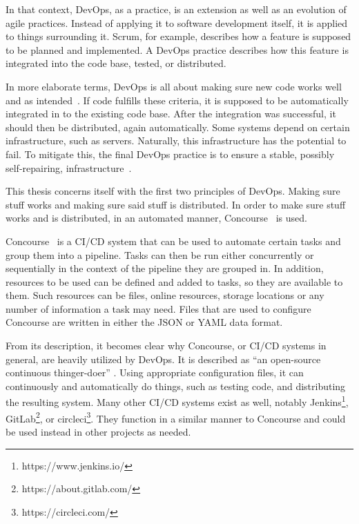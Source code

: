 In that context, DevOps, as a practice, is an extension as well as an evolution of agile practices.
Instead of applying it to software development itself, it is applied to things surrounding it.
Scrum, for example, describes how a feature is supposed to be planned and implemented.
A DevOps practice describes how this feature is integrated into the code base, tested, or distributed.

In more elaborate terms, DevOps is all about making sure new code works well and as intended~\cite{the-software-architext-and-devops}.
If code fulfills these criteria, it is supposed to be automatically integrated in to the existing code base.
After the integration was successful, it should then be distributed, again automatically.
Some systems depend on certain infrastructure, such as servers.
Naturally, this infrastructure has the potential to fail.
To mitigate this, the final DevOps practice is to ensure a stable, possibly self-repairing, infrastructure~\cite{container-and-microservice-driven-design-for-cloud-infrastructure-devops}.

This thesis concerns itself with the first two principles of DevOps.
Making sure stuff works and making sure said stuff is distributed.
In order to make sure stuff works and is distributed, in an automated manner, Concourse~\cite{concourse} is used.

Concourse~\cite{concourse} is a CI/CD system that can be used to automate certain tasks and group them into a pipeline.
Tasks can then be run either concurrently or sequentially in the context of the pipeline they are grouped in.
In addition, resources to be used can be defined and added to tasks, so they are available to them.
Such resources can be files, online resources, storage locations or any number of information a task may need.
Files that are used to configure Concourse are written in either the JSON or YAML data format.

From its description, it becomes clear why Concourse, or CI/CD systems in general, are heavily utilized by DevOps.
It is described as ``an open-source continuous thinger-doer'' \cite{concourse}.
Using appropriate configuration files, it can continuously and automatically do things, such as testing code, and distributing the resulting system.
Many other CI/CD systems exist as well, notably Jenkins\footnote{https://www.jenkins.io/}, GitLab\footnote{https://about.gitlab.com/}, or circleci\footnote{https://circleci.com/}.
They function in a similar manner to Concourse and could be used instead in other projects as needed.

